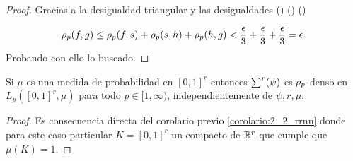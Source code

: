 \begin{proof}
    Gracias a la desigualdad triangular y las desigualdades
    ()
    ()
    ()

    \begin{equation}
        \rho_{p}(f,g) 
        \leq
            \rho_{p}(f,s)
            +\rho_{p}(s,h)
            + \rho_{p}(h,g)
        < 
        \frac{\epsilon}{3} + \frac{\epsilon}{3} + \frac{\epsilon}{3}
        = \epsilon.
    \end{equation}
Probando con ello lo buscado. 
\end{proof}  

\begin{corolario}
    Si $\mu$ es una medida de probabilidad en $[0,1]^r$
    entonces 
    $\sum^r (\psi)$ es $\rho_{p}$-denso en 
    $L_p([0,1]^r, \mu)$ para todo $p \in [1, \infty)$,
    independientemente de $\psi, r, \mu$. 
\end{corolario}
\begin{proof}
    Es consecuencia directa del corolario previo \ref{corolario:2_2_rrnn}
    donde para este caso particular $K = [0,1]^r$ un compacto
    de $\mathbb{R}^r$
    que cumple que $\mu(K) = 1.$
\end{proof}

